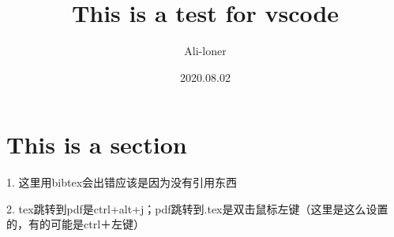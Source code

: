 \documentclass[a4paper]{article}
\title{\heiti\zihao{2} This is a test for vscode}
\author{\songti Ali-loner}
\date{2020.08.02}
\begin{document}
    \maketitle
\begin{abstract}
    \lipsum[2]
\end{abstract}
\tableofcontents
\section{This is a section}
1. 这里用bibtex会出错应该是因为没有引用东西


2. tex跳转到pdf是ctrl+alt+j；pdf跳转到.tex是双击鼠标左键（这里是这么设置的，有的可能是ctrl＋左键）
\end{document}
